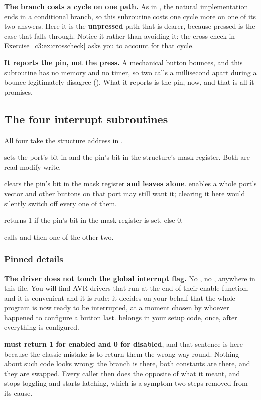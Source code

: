 \textbf{The branch costs a cycle on one path.} As in , the natural
implementation ends in a conditional branch, so this subroutine costs one cycle more on one of its
two answers. Here it is the \textbf{unpressed} path that is dearer, because pressed is the case
that falls through. Notice it rather than avoiding it: the cross-check in
Exercise~\ref{c3:ex:crosscheck} asks you to account for that cycle.

\textbf{It reports the pin, not the press.} A mechanical button bounces, and this subroutine has no
memory and no timer, so two calls a millisecond apart during a bounce legitimately disagree
(). What it reports is the pin, now, and that is all it promises.

\subsection{The four interrupt subroutines}
\label{c3:sec:irq}
All four take the structure address in .

\textbf{} sets the port's bit in  and the pin's bit in the
structure's mask register. Both are read-modify-write.

\textbf{} clears the pin's bit in the mask register \textbf{and leaves
 alone}.  enables a whole port's vector and other buttons on that port may
still want it; clearing it here would silently switch off every one of them.

\textbf{} returns 1 if the pin's bit in the mask register is set,
else 0.

\textbf{} calls  and then one of the other
two.

\subsubsection{Pinned details}
\textbf{The driver does not touch the global interrupt flag.} No , no ,
anywhere in this file. You will find AVR drivers that run  at the end of their enable
function, and it is convenient and it is rude: it decides on your behalf that the whole program is
now ready to be interrupted, at a moment chosen by whoever happened to configure a button last.
 belongs in your setup code, once, after everything is configured.

\textbf{ must return 1 for enabled and 0 for disabled}, and that
sentence is here because the classic mistake is to return them the wrong way round. Nothing about
such code looks wrong: the branch is there, both constants are there, and they are swapped. Every
caller then does the opposite of what it meant, and  stops toggling and
starts latching, which is a symptom two steps removed from its cause.

